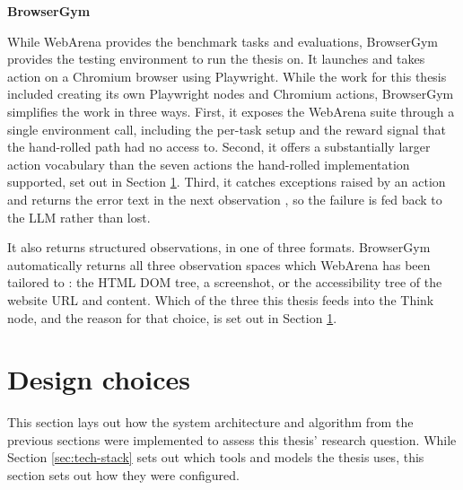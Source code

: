 \textbf{BrowserGym}

While WebArena provides the benchmark tasks and evaluations, BrowserGym provides the testing environment to run the thesis on. It launches and takes action on a Chromium browser using Playwright. While the work for this thesis included creating its own Playwright nodes and Chromium actions, BrowserGym simplifies the work in three ways. First, it exposes the WebArena suite through a single environment call, including the per-task setup and the reward signal that the hand-rolled path had no access to. Second, it offers a substantially larger action vocabulary than the seven actions the hand-rolled implementation supported, set out in Section \ref{sec:experiment_design}. Third, it catches exceptions raised by an action and returns the error text in the next observation \citep{dechezelles2024browsergym}, so the failure is fed back to the LLM rather than lost.

It also returns structured observations, in one of three formats. BrowserGym automatically returns all three observation spaces which WebArena has been tailored to \citep{zhou2024webarena, dechezelles2024browsergym}: the HTML DOM tree, a screenshot, or the accessibility tree of the website URL and content. Which of the three this thesis feeds into the Think node, and the reason for that choice, is set out in Section \ref{sec:experiment_design}.

\section{Design choices}\label{sec:experiment_design}
This section lays out how the system architecture and algorithm from the previous sections were implemented to assess this thesis' research question. While Section \ref{sec:tech-stack} sets out which tools and models the thesis uses, this section sets out how they were configured.

